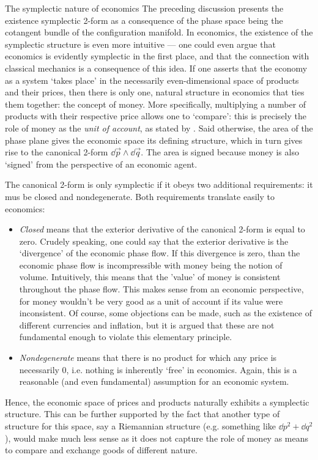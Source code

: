 \begin{econ}{The symplectic nature of economics}
    The preceding discussion presents the existence symplectic 2-form as a consequence of the phase space being the cotangent bundle of the configuration manifold. In economics, the existence of the symplectic structure is even more intuitive --- one could even argue that economics is evidently symplectic in the first place, and that the connection with classical mechanics is a consequence of this idea. If one asserts that the economy as a system `takes place' in the necessarily even-dimensional space of products and their prices, then there is only one, natural structure in economics that ties them together: the concept of money. More specifically, multiplying a number of products with their respective price allows one to `compare': this is precisely the role of money as the \emph{unit of account}, as stated by \citet{Mankiw2017}. Said otherwise, the area of the phase plane gives the economic space its defining structure, which in turn gives rise to the canonical 2-form $\dd{\vec{p}} \wedge \dd{\vec{q}}$. The area is signed because money is also `signed' from the perspective of an economic agent.

    The canonical 2-form is only symplectic if it obeys two additional requirements: it mus be closed and nondegenerate. Both requirements translate easily to economics:
    \begin{itemize}
        \item \emph{Closed} means that the exterior derivative of the canonical 2-form is equal to zero. Crudely speaking, one could say that the exterior derivative is the `divergence' of the economic phase flow. If this divergence is zero, than the economic phase flow is incompressible with money being the notion of volume. Intuitively, this means that the 'value' of money is consistent throughout the phase flow. This makes sense from an economic perspective, for money wouldn't be very good as a unit of account if its value were inconsistent. Of course, some objections can be made, such as the existence of different currencies and inflation, but it is argued that these are not fundamental enough to violate this elementary principle. 
        \item \emph{Nondegenerate} means that there is no product for which any price is necessarily 0, i.e. nothing is inherently `free' in economics. Again, this is a reasonable (and even fundamental) assumption for an economic system.
    \end{itemize}
    Hence, the economic space of prices and products naturally exhibits a symplectic structure. This can be further supported by the fact that another type of structure for this space, say a Riemannian structure (e.g. something like $\dd{p}^2 + \dd{q}^2$), would make much less sense as it does not capture the role of money as means to compare and exchange goods of different nature.
    

\end{econ}
